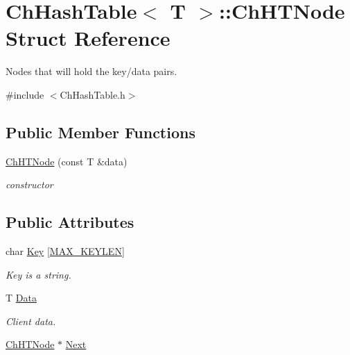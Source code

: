 \hypertarget{structChHashTable_1_1ChHTNode}{\section{Ch\-Hash\-Table$<$ T $>$\-:\-:Ch\-H\-T\-Node Struct Reference}
\label{structChHashTable_1_1ChHTNode}
}


Nodes that will hold the key/data pairs.  




{\ttfamily \#include $<$Ch\-Hash\-Table.\-h$>$}

\subsection*{Public Member Functions}
\begin{DoxyCompactItemize}
\item 
\hypertarget{structChHashTable_1_1ChHTNode_a6f06db29c7bcb70eacd09757336332e9}{\hyperlink{structChHashTable_1_1ChHTNode_a6f06db29c7bcb70eacd09757336332e9}{Ch\-H\-T\-Node} (const T \&data)}\label{structChHashTable_1_1ChHTNode_a6f06db29c7bcb70eacd09757336332e9}

\begin{DoxyCompactList}\small\item\em constructor \end{DoxyCompactList}\end{DoxyCompactItemize}
\subsection*{Public Attributes}
\begin{DoxyCompactItemize}
\item 
\hypertarget{structChHashTable_1_1ChHTNode_a5fee889293c55bc4f8039992de0ca97b}{char \hyperlink{structChHashTable_1_1ChHTNode_a5fee889293c55bc4f8039992de0ca97b}{Key} \mbox{[}\hyperlink{ChHashTable_8h_ac07178281e212a9f6e265a6b21ae7d7f}{M\-A\-X\-\_\-\-K\-E\-Y\-L\-E\-N}\mbox{]}}\label{structChHashTable_1_1ChHTNode_a5fee889293c55bc4f8039992de0ca97b}

\begin{DoxyCompactList}\small\item\em Key is a string. \end{DoxyCompactList}\item 
\hypertarget{structChHashTable_1_1ChHTNode_aa57eacd0c1133ff04674411a6ffba64d}{T \hyperlink{structChHashTable_1_1ChHTNode_aa57eacd0c1133ff04674411a6ffba64d}{Data}}\label{structChHashTable_1_1ChHTNode_aa57eacd0c1133ff04674411a6ffba64d}

\begin{DoxyCompactList}\small\item\em Client data. \end{DoxyCompactList}\item 
\hyperlink{structChHashTable_1_1ChHTNode}{Ch\-H\-T\-Node} $\ast$ \hyperlink{structChHashTable_1_1ChHTNode_a332fb29106442e7df383f71ccfb81f2a}{Next}
\end{DoxyCompactItemize}


